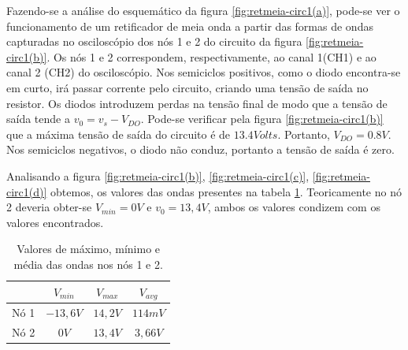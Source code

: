 \documentclass[a4paper]{article} %
\begin{document}
\newpage
          Fazendo-se a análise do esquemático da figura  \ref{fig:retmeia-circ1(a)}, pode-se ver o funcionamento de um retificador de meia onda a partir das formas de ondas capturadas no osciloscópio dos nós 1 e 2 do circuito da figura  \ref{fig:retmeia-circ1(b)}. Os nós 1 e 2 correspondem, respectivamente, ao canal 1(CH1) e ao canal 2 (CH2) do osciloscópio. Nos semiciclos positivos, como o diodo encontra-se em curto, irá passar corrente pelo circuito, criando uma tensão de saída no resistor. Os diodos introduzem perdas na tensão final de modo que a tensão de saída tende a $v_0=v_s-V_{DO}$. Pode-se verificar pela figura  \ref{fig:retmeia-circ1(b)} que a máxima tensão de saída do circuito é de   $13.4 Volts$. Portanto,    $V_{DO}= 0.8V $. Nos semiciclos negativos, o diodo não conduz, portanto a tensão de saída é zero.


Analisando a figura \ref{fig:retmeia-circ1(b)},  \ref{fig:retmeia-circ1(c)}, \ref{fig:retmeia-circ1(d)} obtemos, os valores das ondas presentes na tabela \ref{tab:ret_mei_onda}. Teoricamente no nó 2 deveria obter-se $V_{min}=0V$ e $v_0=13,4V$, ambos os valores condizem com os valores encontrados.

    
\begin{table}[h!]
\begin{centering}
\begin{tabular}{|c|c|c|c|}
\cline{2-4} 
\multicolumn{1}{c|}{} & $V_{min}$ & $V_{max}$ & $V_{avg}$\tabularnewline
\hline 
Nó 1 & $-13,6V$ & $14,2V$ & $114mV$\tabularnewline
\hline 
Nó 2 & $0V$ & $13,4V$ & $3,66V$\tabularnewline
\hline
\end{tabular}
\par\end{centering}

\caption{Valores de máximo, mínimo e média das ondas nos nós 1 e 2.}
\label{tab:ret_mei_onda}
\end{table}
\end{document}
